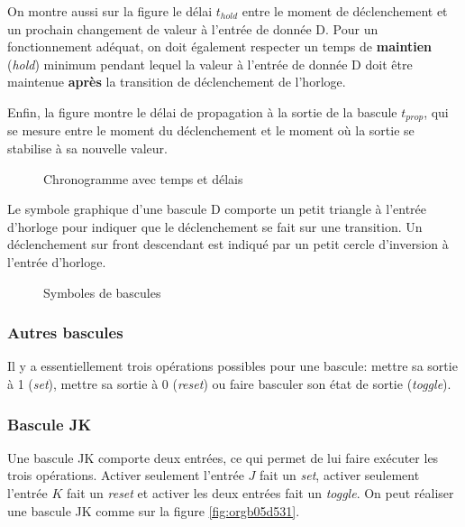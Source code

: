 \documentclass[11pt]{article}
\begin{document}
On montre aussi sur la figure le délai \(t_{hold}\) entre le moment de
déclenchement et un prochain changement de valeur à l'entrée de
donnée D. Pour un fonctionnement adéquat, on doit également respecter
un temps de \textbf{maintien} (\emph{hold}) minimum pendant lequel la valeur à
l'entrée de donnée D doit être maintenue \textbf{après} la transition de
déclenchement de l'horloge.

Enfin, la figure montre le délai de propagation à la sortie de la
bascule \(t_{prop}\), qui se mesure entre le moment du déclenchement et
le moment où la sortie se stabilise à sa nouvelle valeur.

\begin{figure}[htbp]
\centering

\caption{\label{fig:orgbc882b5}Chronogramme avec temps et délais}
\end{figure}

Le symbole graphique d'une bascule D comporte un petit triangle à
l'entrée d'horloge pour indiquer que le déclenchement se fait sur une
transition. Un déclenchement sur front descendant est indiqué par un
petit cercle d'inversion à l'entrée d'horloge.

\begin{figure}[htbp]
\centering

\caption{\label{fig:org406cf83}Symboles de bascules}
\end{figure}

\subsubsection{Autres bascules}
\label{sec:orge0939f1}

Il y a essentiellement trois opérations possibles pour une bascule:
mettre sa sortie à 1 (\emph{set}), mettre sa sortie à 0 (\emph{reset}) ou faire
basculer son état de sortie (\emph{toggle}).

\subsubsection{Bascule JK}
\label{sec:org5881450}

Une bascule JK comporte deux entrées, ce qui permet de lui faire
exécuter les trois opérations. Activer seulement l'entrée \(J\) fait
un \emph{set}, activer seulement l'entrée \(K\) fait un \emph{reset} et activer
les deux entrées fait un \emph{toggle}. On peut réaliser une bascule JK
comme sur la figure \ref{fig:orgb05d531}.
\end{document}
